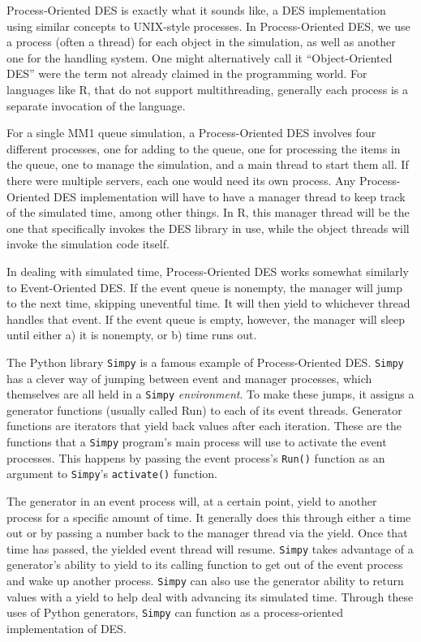 \documentclass[a4paper, 11pt]{article} %
\begin{document}
Process-Oriented DES is exactly what it sounds like, a DES implementation using similar concepts to UNIX-style processes. In Process-Oriented DES, we use a process (often a thread) for each object in the simulation, as well as another one for the handling system. One might alternatively call it “Object-Oriented DES” were the term not already claimed in the programming world. For languages like R, that do not support multithreading, generally each process is a separate invocation of the language.

For a single MM1 queue simulation, a Process-Oriented DES involves four different processes, one for adding to the queue, one for processing the items in the queue, one to manage the simulation, and a main thread to start them all. If there were multiple servers, each one would need its own process. Any Process-Oriented DES implementation will have to have a manager thread to keep track of the simulated time, among other things. In R, this manager thread will be the one that specifically invokes the DES library in use, while the object threads will invoke the simulation code itself.

In dealing with simulated time, Process-Oriented DES works somewhat similarly to Event-Oriented DES. If the event queue is nonempty, the manager will jump to the next time, skipping uneventful time. It will then yield to whichever thread handles that event. If the event queue is empty, however, the manager will sleep until either a) it is nonempty, or b) time runs out. 

The Python library \texttt{Simpy} is a famous example of Process-Oriented DES. \texttt{Simpy} has a clever way of jumping between event and manager processes, which themselves are all held in a \texttt{Simpy} \textit{environment}. To make these jumps, it assigns a generator functions (usually called Run) to each of its event threads. Generator functions are iterators that yield back values after each iteration. These are the functions that a \texttt{Simpy} program’s main process will use to activate the event processes. This happens by passing the event process’s \texttt{Run()} function as an argument to \texttt{Simpy}’s \texttt{activate()} function.

The generator in an event process will, at a certain point, yield to another process for a specific amount of time. It generally does this through either a time out or by passing a number back to the manager thread via the yield. Once that time has passed, the yielded event thread will resume. \texttt{Simpy} takes advantage of a generator’s ability to yield to its calling function to get out of the event process and wake up another process. \texttt{Simpy} can also use the generator ability to return values with a yield to help deal with advancing its simulated time. Through these uses of Python generators, \texttt{Simpy} can function as a process-oriented implementation of DES.
\end{document}
